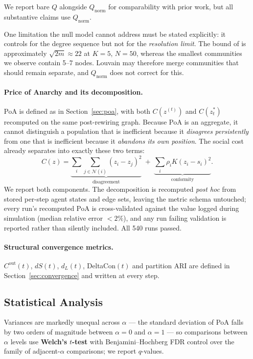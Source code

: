 We report bare $Q$ alongside $Q_{\mathrm{norm}}$ for comparability with prior work, but
all substantive claims use $Q_{\mathrm{norm}}$.

One limitation the null model cannot address must be stated explicitly: it controls for
the degree sequence but not for the \emph{resolution limit}. The bound of
\citet{fortunato2007resolution} is approximately $\sqrt{2m} \approx 22$ at $K = 5$,
$N = 50$, whereas the smallest communities we observe contain 5--7 nodes. Louvain may
therefore merge communities that should remain separate, and $Q_{\mathrm{norm}}$ does
not correct for this.

\paragraph{Price of Anarchy and its decomposition.}
PoA is defined as in Section~\ref{sec:poa}, with both $C(z^{(t)})$ and $C(z^*_t)$
recomputed on the same post-rewiring graph. Because PoA is an aggregate, it cannot
distinguish a population that is inefficient because it \emph{disagrees persistently}
from one that is inefficient because it \emph{abandons its own position}. The social
cost already separates into exactly these two terms:
\[
C(z) = \underbrace{\sum_i \sum_{j \in \mathcal{N}(i)} (z_i - z_j)^2}_{\text{disagreement}}
     \; + \; \underbrace{\sum_i \rho_i K (z_i - s_i)^2}_{\text{conformity}} .
\]
We report both components. The decomposition is recomputed \emph{post hoc} from stored
per-step agent states and edge sets, leaving the metric schema untouched; every run's
recomputed PoA is cross-validated against the value logged during simulation (median
relative error $< 2\%$), and any run failing validation is reported rather than silently
included. All 540 runs passed.

\paragraph{Structural convergence metrics.}
$C^{\mathrm{out}}(t)$, $dS(t)$, $d_L(t)$, DeltaCon$(t)$ and partition ARI are defined in
Section~\ref{sec:convergence} and written at every step.

\subsection{Statistical Analysis}
\label{sec:stats}

Variances are markedly unequal across $\alpha$ --- the standard deviation of PoA falls by
two orders of magnitude between $\alpha = 0$ and $\alpha = 1$ --- so comparisons between
$\alpha$ levels use \textbf{Welch's $t$-test} with Benjamini--Hochberg FDR control over
the family of adjacent-$\alpha$ comparisons; we report $q$-values.

